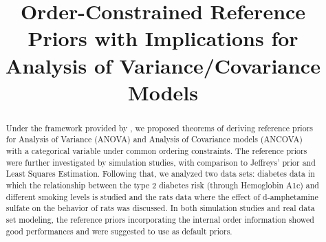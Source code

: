 \documentclass[Proceedings]{ascelike}
\begin{document}
%
\title{Order-Constrained Reference Priors with
Implications for Analysis of Variance/Covariance Models}
%
\author{
%
%
%
%
%
%
%
}
%
\maketitle
%
\begin{abstract}
Under the framework provided by \cite{BergerBernardo1992}, we proposed theorems of deriving reference priors for Analysis of Variance (ANOVA) and Analysis of Covariance models (ANCOVA) with a categorical variable under common ordering constraints. The reference priors were further investigated by simulation studies, with comparison to Jeffreys' prior and Least Squares Estimation. Following that, we analyzed two data sets: diabetes data  in which the relationship between the type 2 diabetes risk (through Hemoglobin A1c) and different smoking levels is studied and the rats data where the effect of d-amphetamine sulfate on the behavior of rats was discussed. In both simulation studies and real data set modeling, the reference priors incorporating the internal order information showed good performances and were suggested to use as default priors. 
\end{abstract}
%
%
%
\end{document}
